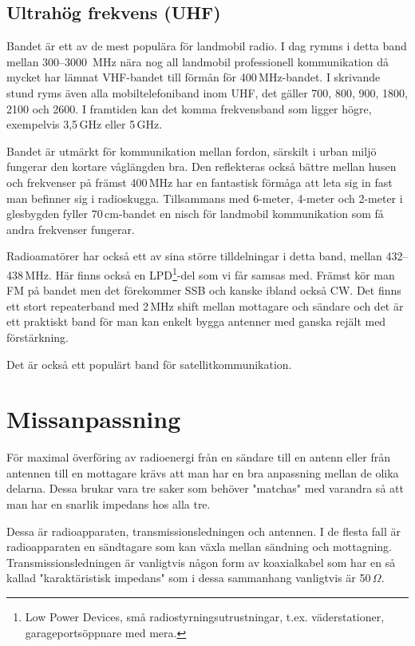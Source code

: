 \subsection{Ultrahög frekvens (UHF)}

Bandet är ett av de mest populära för landmobil radio. I dag rymms i detta
band mellan 300--3000\- \,MHz nära nog all landmobil professionell
kommunikation då mycket har lämnat VHF-bandet till förmån för 400\,MHz-bandet.
I skrivande stund ryms även alla mobiltelefoniband inom UHF, det gäller 700,
800, 900, 1800, 2100 och 2600. I framtiden kan det komma frekvensband som
ligger högre, exempelvis 3,5\,GHz eller 5\,GHz.

Bandet är utmärkt för kommunikation mellan fordon, särskilt i urban miljö
fungerar den kortare våglängden bra. Den reflekteras också bättre mellan husen
och frekvenser på främst 400\,MHz har en fantastisk förmåga att leta sig in
fast man befinner sig i radioskugga. Tillsammans med 6-meter, 4-meter och
2-meter i glesbygden fyller 70\,cm-bandet en nisch för landmobil kommunikation
som få andra frekvenser fungerar.

Radioamatörer har också ett av sina större tilldelningar i detta band, mellan
432--438\,MHz. Här finns också en LPD\footnote{Low Power Devices, små
radiostyrningsutrustningar, t.ex. väderstationer, garageportsöppnare med
mera.}-del som vi får samsas med. Främst kör man FM på bandet men det
förekommer SSB och kanske ibland också CW. Det finns ett stort repeaterband
med 2\,MHz shift mellan mottagare och sändare och det är ett praktiskt band
för man kan enkelt bygga antenner med ganska rejält med förstärkning.

Det är också ett populärt band för satellitkommunikation.

\section{Missanpassning}

För maximal överföring av radioenergi från en sändare till en antenn eller
från antennen till en mottagare krävs att man har en bra anpassning mellan de
olika delarna. Dessa brukar vara tre saker som behöver "matchas" med varandra
så att man har en snarlik impedans hos alla tre.

Dessa är radioapparaten, transmissionsledningen och antennen. I de flesta fall
är radioapparaten en sändtagare som kan växla mellan sändning och mottagning.
Transmissionsledningen är vanligtvis någon form av koaxialkabel som har en så
kallad "karaktäristisk impedans" som i dessa sammanhang vanligtvis är
50\,$\Omega$.

